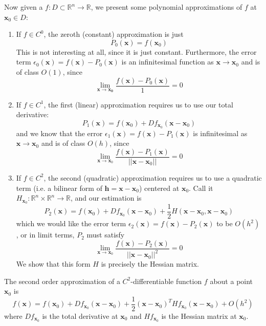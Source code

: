   Now given a $f: D \subset \mathbb{R}^n \longrightarrow \mathbb{R}$, we present some polynomial approximations of $f$ at $\mathbf{x}_0 \in D$: 
  \begin{enumerate}
      \item If $f \in C^0$, the zeroth (constant) approximation is just 
      \[P_0 (\mathbf{x}) = f(\mathbf{x}_0)\]
      This is not interesting at all, since it is just constant. Furthermore, the error term $\epsilon_0 (\mathbf{x}) = f(\mathbf{x}) - P_0 (\mathbf{x})$ is an infinitesimal function as $\mathbf{x} \rightarrow \mathbf{x}_0$ and is of class $O(1)$, since 
      \[\lim_{\mathbf{x} \rightarrow \mathbf{x_0}} \frac{f(\mathbf{x}) - P_0 (\mathbf{x})}{1} = 0\]
      
      \item If $f \in C^1$, the first (linear) approximation requires us to use our total derivative: 
      \[P_1 (\mathbf{x}) = f(\mathbf{x}_0) + D f_{\mathbf{x}_0} (\mathbf{x} - \mathbf{x}_0)\]
      and we know that the error $\epsilon_1 (\mathbf{x}) = f(\mathbf{x}) - P_1 (\mathbf{x})$ is infinitesimal as $\mathbf{x} \rightarrow \mathbf{x}_0$ and is of class $O(h)$, since 
      \[\lim_{\mathbf{x} \rightarrow \mathbf{x}_0} \frac{f(\mathbf{x}) - P_1(\mathbf{x})}{||\mathbf{x} - \mathbf{x}_0||} = 0\]
      
      \item If $f \in C^2$, the second (quadratic) approximation requires us to use a quadratic term (i.e. a bilinear form of $\mathbf{h} = \mathbf{x} - \mathbf{x}_0$) centered at $\mathbf{x}_0$. Call it $H_{\mathbf{x}_0}: \mathbb{R}^n \times \mathbb{R}^n \longrightarrow \mathbb{R}$, and our estimation is 
      \[P_2 (\mathbf{x}) = f(\mathbf{x}_0) + D f_{\mathbf{x}_0} (\mathbf{x} - \mathbf{x}_0) + \frac{1}{2} H (\mathbf{x} - \mathbf{x}_0, \mathbf{x} - \mathbf{x}_0)\]
      which we would like the error term $\epsilon_2 (\mathbf{x}) = f(\mathbf{x}) - P_2 (\mathbf{x})$ to be $O(h^2)$, or in limit terms, $P_2$ must satisfy 
      \[\lim_{\mathbf{x} \rightarrow \mathbf{x}_0} \frac{f(\mathbf{x}) - P_2 (\mathbf{x})}{||\mathbf{x} - \mathbf{x}_0||^2} = 0\]
      We show that this form $H$ is precisely the Hessian matrix. 
  \end{enumerate}

  \begin{theorem}[Hessian]
  The second order approximation of a $C^2$-differentiable function $f$ about a point $\mathbf{x}_0$ is 
  \[f (\mathbf{x}) = f(\mathbf{x}_0) + D f_{\mathbf{x}_0} (\mathbf{x} - \mathbf{x}_0) + \frac{1}{2} (\mathbf{x} - \mathbf{x}_0)^T H f_{\mathbf{x}_0} (\mathbf{x} - \mathbf{x}_0) + O(h^2)\]
  where $D f_{\mathbf{x}_0}$ is the total derivative at $\mathbf{x}_0$ and $H f_{\mathbf{x}_0}$ is the Hessian matrix at $\mathbf{x}_0$. 
  \end{theorem}


